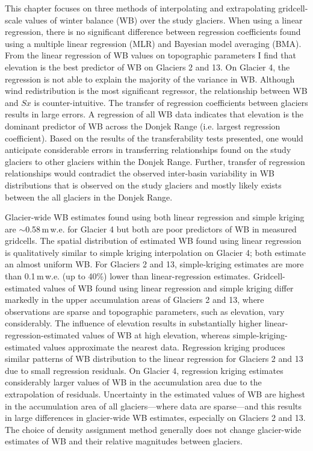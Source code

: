 \documentclass{sfuthesis}
\begin{document}
{This chapter focuses on three methods of interpolating and extrapolating gridcell-scale values of winter balance (WB) over the study glaciers. When using a linear regression, there is no significant difference between regression coefficients found using a multiple linear regression (MLR) and Bayesian model averaging (BMA). From the linear regression of WB values on topographic parameters I find that elevation is the best predictor of WB on Glaciers 2 and 13. On Glacier 4, the regression is not able to explain the majority of the variance in WB. Although wind redistribution is the most significant regressor, the relationship between WB and $Sx$ is counter-intuitive. The transfer of regression coefficients between glaciers results in large errors. A regression of all WB data indicates that elevation is the dominant predictor of WB across the Donjek Range (i.e. largest regression coefficient). Based on the results of the transferability tests presented, one would anticipate considerable errors in transferring relationships found on the study glaciers to other glaciers within the Donjek Range. Further, transfer of regression relationships would contradict the observed inter-basin variability in WB distributions that is observed on the study glaciers and mostly likely exists between the all glaciers in the Donjek Range. 

Glacier-wide WB estimates found using both linear regression and simple kriging are $\sim$0.58\,m\,w.e. for Glacier 4 but both are poor predictors of WB in measured gridcells. The spatial distribution of estimated WB found using linear regression is qualitatively similar to simple kriging interpolation on Glacier 4; both estimate an almost uniform WB. For Glaciers 2 and 13, simple-kriging estimates are more than 0.1\,m\,w.e. (up to 40\%) lower than linear-regression estimates. Gridcell-estimated values of WB found using linear regression and simple kriging differ markedly in the upper accumulation areas of Glaciers 2 and 13, where observations are sparse and topographic parameters, such as elevation, vary considerably. The influence of elevation results in substantially higher linear-regression-estimated values of WB at high elevation, whereas simple-kriging-estimated values approximate the nearest data. Regression kriging produces similar patterns of WB distribution to the linear regression for Glaciers 2 and 13 due to small regression residuals. On Glacier 4, regression kriging estimates considerably larger values of WB in the accumulation area due to the extrapolation of residuals. Uncertainty in the estimated values of WB are highest in the accumulation area of all glaciers---where data are sparse---and this results in large differences in glacier-wide WB estimates, especially on Glaciers 2 and 13. The choice of density assignment method generally does not change glacier-wide estimates of WB and their relative magnitudes between glaciers.

}
\end{document}
